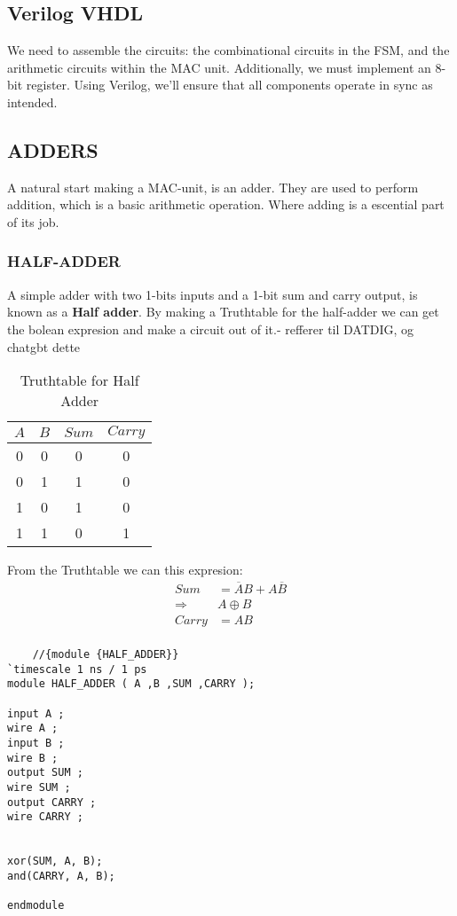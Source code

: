 \subsection{Verilog VHDL}


We need to assemble the circuits: the combinational circuits in the FSM, and the arithmetic circuits within the MAC unit. Additionally, we must implement an 8-bit register. Using Verilog, we'll ensure that all components operate in sync as intended.

\subsection{ADDERS}
A natural start making a MAC-unit, is an adder. They are used to perform addition, which is a basic arithmetic operation. Where adding is a escential part of its job.
\subsubsection{HALF-ADDER}
A simple adder with two 1-bits inputs and a 1-bit sum and carry output, is known as a \textbf{Half adder}. By making a Truthtable for the half-adder we can get the bolean expresion and make a circuit out of it.- refferer til DATDIG, og chatgbt dette
\begin{table}[H]
    \caption{Truthtable for Half Adder}                 
    \centering
    \begin{tabular}{|c|c|c|c|}
    \hline
    \(A\) & \(B\) & \(Sum\) & \(Carry\) \\
    \hline
    0 & 0 & 0 & 0 \\
    0 & 1 & 1 & 0 \\
    1 & 0 & 1 & 0 \\
    1 & 1 & 0 & 1 \\
    \hline
\end{tabular}
\end{table}
From the Truthtable we can this expresion:
\begin{equation}
    \begin{aligned}
        Sum&=\overline{A}B+A\overline{B}\\
        \Rightarrow&A\oplus B\\
        Carry&=AB\\ 
    \end{aligned}
\end{equation}
\begin{lstlisting}
    //{module {HALF_ADDER}}	 
`timescale 1 ns / 1 ps
module HALF_ADDER ( A ,B ,SUM ,CARRY );

input A ;
wire A ;
input B ;
wire B ;
output SUM ;
wire SUM ;
output CARRY ;
wire CARRY ;


xor(SUM, A, B);
and(CARRY, A, B);

endmodule
\end{lstlisting}

